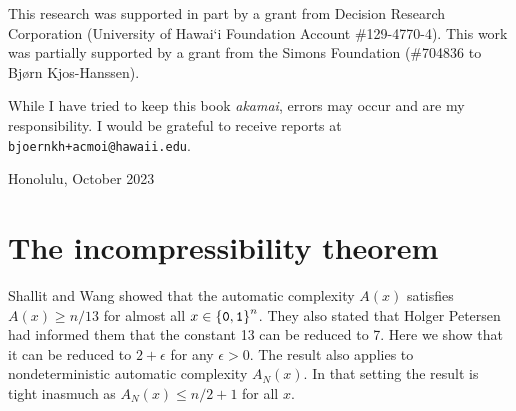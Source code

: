 	This research was supported in part by a grant from Decision Research Corporation
	(University of Hawai\textquoteleft i Foundation Account \#129-4770-4).
	This work was partially supported by a grant from the Simons Foundation (\#704836 to Bj\o rn Kjos-Hanssen).

	While I have tried to keep this book \emph{akamai}, errors may occur and are my responsibility.
	I would be grateful to receive reports at \texttt{bjoernkh+acmoi@hawaii.edu}.

\begin{flushright}	
	Honolulu, October 2023
\end{flushright}


\chapter{The incompressibility theorem}\label{chap:FMS}

	Shallit and Wang showed that the automatic complexity $A(x)$ satisfies $A(x)\ge n/13$ for almost all $x\in{\{\mathtt{0},\mathtt{1}\}}^n$.
	They also stated that Holger Petersen had informed them that the constant 13 can be reduced to 7.
	Here we show that it can be reduced to $2+\epsilon$ for any $\epsilon>0$.
	The result also applies to nondeterministic automatic complexity $A_N(x)$.
	In that setting the result is tight inasmuch as $A_N(x)\le n/2+1$ for all $x$.


